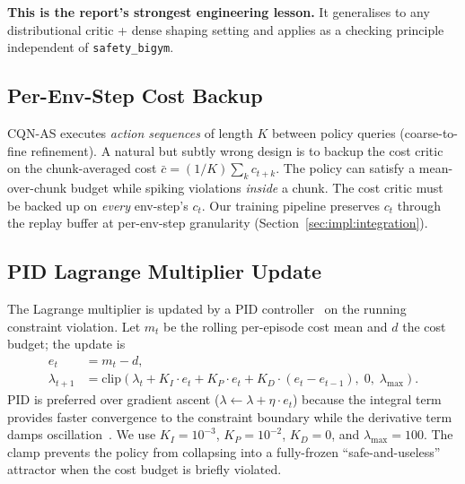 \documentclass[11pt,a4paper]{report}
\newcommand{\sbigym}{\texttt{safety\_bigym}}
\newcommand{\cqnas}{CQN-AS}
\begin{document}
\textbf{This is the report's strongest engineering lesson.} It
generalises to any distributional critic + dense shaping setting
and applies as a checking principle independent of \sbigym{}.

\subsection{Per-Env-Step Cost Backup}
\label{sec:method:lagrangian:per-step}

\cqnas{} executes \emph{action sequences} of length $K$ between
policy queries (coarse-to-fine refinement). A natural but subtly
wrong design is to backup the cost critic on the chunk-averaged
cost $\bar{c} = (1/K) \sum_{k} c_{t+k}$. The policy can satisfy a
mean-over-chunk budget while spiking violations \emph{inside} a
chunk. The cost critic must be backed up on \emph{every} env-step's
$c_t$. Our training pipeline preserves $c_t$ through the replay
buffer at per-env-step granularity
(Section~\ref{sec:impl:integration}).

\subsection{PID Lagrange Multiplier Update}
\label{sec:method:lagrangian:pid}

The Lagrange multiplier is updated by a PID
controller~\cite{stooke2020pid} on the running constraint violation.
Let $m_t$ be the rolling per-episode cost mean and $d$ the cost
budget; the update is
\begin{align}
  e_t &= m_t - d, \\
  \lambda_{t+1} &= \mathrm{clip}\!\left(\lambda_t + K_I \cdot e_t
    + K_P \cdot e_t + K_D \cdot (e_t - e_{t-1}),
    \; 0,\; \lambda_{\max}\right).
  \label{eq:pid-lambda}
\end{align}
PID is preferred over gradient ascent
($\lambda \leftarrow \lambda + \eta \cdot e_t$) because the
integral term provides faster convergence to the constraint
boundary while the derivative term damps
oscillation~\cite{stooke2020pid}. We use $K_I = 10^{-3}$,
$K_P = 10^{-2}$, $K_D = 0$, and $\lambda_{\max} = 100$. The clamp
prevents the policy from collapsing into a fully-frozen
``safe-and-useless'' attractor when the cost budget is briefly
violated.
\end{document}
